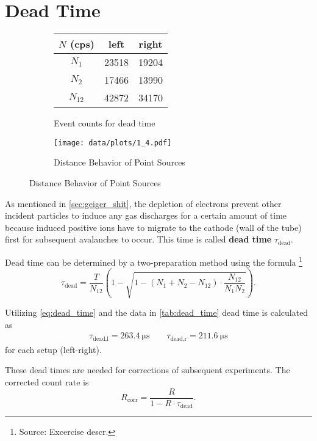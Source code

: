 \section{Dead Time}
\begin{figure}[tbp]
	\begin{subfigure}{.4\textwidth}
		\centering
		\caption{Event counts for dead time}
		\label{tab:dead_time}
		\begin{tabular}{SSS}
			\toprule
			{$N$ (cps)}	&	{left}&	{right}\\
			\midrule
				{$N_1$}	&	\num{23518}	&	\num{19204}	\\
				{$N_2$}	&	\num{17466}	&	\num{13990}	\\
				{$N_{12}$}	&	\num{42872}	&	\num{34170}	\\
			\bottomrule
		\end{tabular}
	\end{subfigure}
	\begin{subfigure}{.8\textwidth}
		\centering
		\texttt{[image: data/plots/1\_4.pdf]}
		\caption{Distance Behavior of Point Sources}
		\label{fig:invsq}
	\end{subfigure}
\end{figure}

As mentioned in \autoref{sec:geiger_shit}, the depletion of electrons prevent other incident particles to induce any gas discharges for a certain amount of time because induced positive ions have to migrate to the cathode (wall of the tube) first for subsequent avalanches to occur.
This time is called \textbf{dead time} $\tau_\text{dead}$.

Dead time can be determined by a two-preparation method using the formula \footnote{Source: Excercise descr.}
\begin{equation}\label{eq:dead_time}
	\tau_\text{dead} = \frac{T}{N_{12}}\left(1-\sqrt{1-\left(N_1+N_2-N_{12}\right)\cdot\frac{N_{12}}{N_1N_2}}\right).
\end{equation}

Utilizing \autoref{eq:dead_time} and the data in \autoref{tab:dead_time} dead time is calculated as
\begin{gather*}
 	\tau_\text{dead,l}=\SI{263.4}{\micro\second}\qquad \tau_\text{dead,r}=\SI{211.6}{\micro\second}
\end{gather*}
for each setup (left-right).

These dead times are needed for corrections of subsequent experiments.
The corrected count rate is
\begin{equation}\label{eq:dead_time_corr}
	R_\text{corr}=\frac{R}{1-R\cdot\tau_\text{dead}}.
\end{equation}

